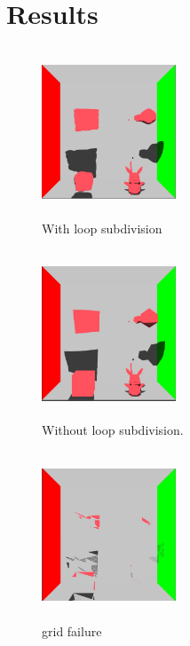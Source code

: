 \documentclass[acmtog]{acmart}
\begin{document}
\section{Results}

\begin{figure}[h]
\centering
\includegraphics[width=4cm,height=5cm]{complete.jpg}
\caption{With loop subdivision}
\end{figure}

\begin{figure}[h]
	\centering
	\includegraphics[width=4cm,height=5cm]{no_loop.jpg}
	\caption{Without loop subdivision.}
\end{figure}

\begin{figure}[h]
	\centering
	\includegraphics[width=4cm,height=5cm]{grid_fail.jpg}
	\caption{grid failure}
\end{figure}
\end{document}
